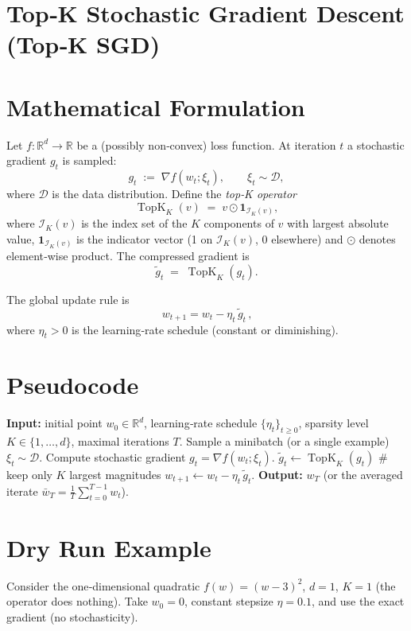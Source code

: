\documentclass{article}
\newcommand{\TopK}[2]{\operatorname{TopK}_{#1}(#2)} %
\begin{document}
\section*{Top‑K Stochastic Gradient Descent (Top‑K SGD)}

\section*{Mathematical Formulation}
Let $f:\mathbb{R}^{d}\rightarrow\mathbb{R}$ be a (possibly non‑convex) loss function.  
At iteration $t$ a stochastic gradient $g_t$ is sampled:
\[
g_t\;:=\;\nabla f(w_t;\xi_t),\qquad \xi_t\sim\mathcal{D},
\]
where $\mathcal{D}$ is the data distribution.  
Define the \emph{top‑K operator}
\[
\TopK{K}{v}\;=\;v\odot \mathbf{1}_{\mathcal{I}_K(v)},
\]
where $\mathcal{I}_K(v)$ is the index set of the $K$ components of $v$ with largest absolute value,
$\mathbf{1}_{\mathcal{I}_K(v)}$ is the indicator vector (1 on $\mathcal{I}_K(v)$, 0 elsewhere) and $\odot$ denotes element‑wise product.
The compressed gradient is
\[
\tilde g_t \;=\; \TopK{K}{g_t}.
\]

The global update rule is
\[
\boxed{\,w_{t+1}=w_t-\eta_t\,\tilde g_t\,},
\tag{1}
\]
where $\eta_t>0$ is the learning‑rate schedule (constant or diminishing).

\section*{Pseudocode}
\begin{algorithm}[H]
\caption{Top‑K SGD}
\begin{algorithmic}[1]
\STATE \textbf{Input:} initial point $w_0\in\mathbb{R}^d$, learning‑rate schedule $\{\eta_t\}_{t\ge0}$, sparsity level $K\in\{1,\dots,d\}$, maximal iterations $T$.
    \STATE Sample a minibatch (or a single example) $\xi_t\sim\mathcal{D}$.
    \STATE Compute stochastic gradient $g_t=\nabla f(w_t;\xi_t)$.
    \STATE $\tilde g_t\gets\TopK{K}{g_t}$ \hfill\# keep only $K$ largest magnitudes
    \STATE $w_{t+1}\gets w_t-\eta_t\,\tilde g_t$.
\ENDFOR
\STATE \textbf{Output:} $w_T$ (or the averaged iterate $\bar w_T=\frac1T\sum_{t=0}^{T-1}w_t$).
\end{algorithmic}
\end{algorithm}

\section*{Dry Run Example}
Consider the one‑dimensional quadratic $f(w)=(w-3)^2$, $d=1$, $K=1$ (the operator does nothing).  
Take $w_0=0$, constant stepsize $\eta=0.1$, and use the exact gradient (no stochasticity).
\end{document}
